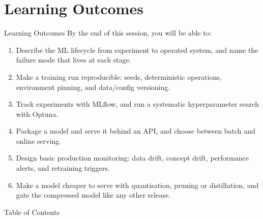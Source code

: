 \section{Learning Outcomes}

\begin{frame}{Learning Outcomes}
    By the end of this session, you will be able to:

    \vspace{0.5em}
    \begin{enumerate}
        \item Describe the ML lifecycle from experiment to operated system, and name the failure mode that lives at each stage.

        \item Make a training run reproducible: seeds, deterministic operations, environment pinning, and data/config versioning.

        \item Track experiments with MLflow, and run a systematic hyperparameter search with Optuna.

        \item Package a model and serve it behind an API, and choose between batch and online serving.

        \item Design basic production monitoring: data drift, concept drift, performance alerts, and retraining triggers.

        \item Make a model cheaper to serve with quantisation, pruning or distillation, and gate the compressed model like any other release.
    \end{enumerate}
\end{frame}

\begin{frame}[allowframebreaks]{Table of Contents}
    \tableofcontents
\end{frame}
